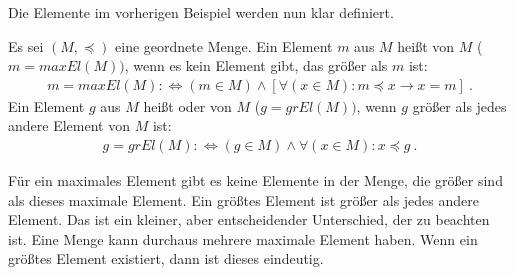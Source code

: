 \begin{Unit}
Die Elemente im vorherigen Beispiel werden nun klar definiert.
  
\begin{Definition}
  Es sei $(M,\preceq)$ eine geordnete Menge. Ein Element $m$ aus $M$ heißt
   von $M$ ($m = 
  maxEl(M))$, wenn es kein Element gibt, das größer als $m$ ist:
  \begin{align}
    m = maxEl(M) :\Leftrightarrow (m \in M) \land [\forall (x \in M): m 
      \preceq x \rightarrow x = m] \ .
  \end{align} 
  Ein Element $g$ aus $M$ heißt  oder  von $M$ ($g = grEl(M))$, wenn $g$ größer 
  als jedes andere Element von $M$ ist:
  \begin{align}
    g = grEl(M) :\Leftrightarrow (g \in M) \land \forall (x \in M): 
    x \preceq g \ .
  \end{align} 
\end{Definition}

Für ein maximales Element gibt es keine Elemente in der Menge, die größer 
sind als dieses maximale Element. Ein größtes Element ist größer als jedes 
andere Element. Das ist ein kleiner, aber entscheidender Unterschied, der zu
beachten ist. Eine Menge kann durchaus mehrere maximale Element haben. Wenn 
ein größtes Element existiert, dann ist dieses eindeutig.
\end{Unit}

